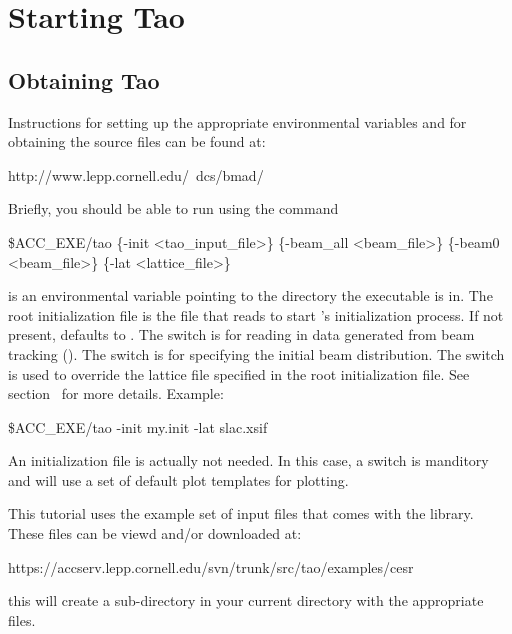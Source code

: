 \chapter{Starting Tao}
\label{c:starting.tao}

\section{Obtaining Tao}
\label{s:obtaining}

Instructions for setting up the appropriate environmental variables
and for obtaining the source files can be found at:
\begin{example}
  http://www.lepp.cornell.edu/~dcs/bmad/
\end{example}

Briefly, you should be able to run \tao using the command
\begin{example}
  \$ACC_EXE/tao \{-init <tao_input_file>\} \{-beam_all <beam_file>\} 
           \{-beam0 <beam_file>\} \{-lat <lattice_file>\}
\end{example}
 is an environmental variable pointing to the directory
the \tao executable is in.  The root initialization file
 is the file that \tao reads to start \tao's
initialization process. If not present,  defaults
to . The  switch is for reading in data
generated from beam tracking (). The 
switch is for specifying the initial beam distribution.  The
 switch is used to override the lattice file specified in
the root initialization file. See section~ for
more details. Example:
\begin{example}
  \$ACC_EXE/tao -init my.init -lat slac.xsif
\end{example}
An initialization file is actually not needed. In this case, a
 switch is manditory and \tao will use a set of default plot
templates for plotting.

This tutorial uses the example set of input files that comes with the \tao library.
These files can be viewd and/or downloaded at:
\begin{example}
  https://accserv.lepp.cornell.edu/svn/trunk/src/tao/examples/cesr
\end{example}
this will create a sub-directory  in your current directory with 
the appropriate files.

